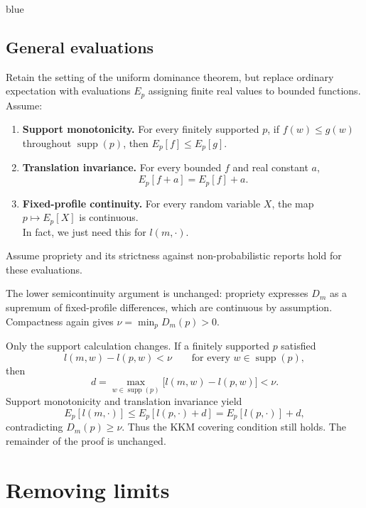 \documentclass[11pt]{article}
\theoremstyle{definition}
\theoremstyle{remark}
\newcommand{\supp}{\operatorname{supp}}
\newenvironment{AIwritten}{\begin{color}{blue}}{\end{color}}
\begin{document}
\begin{AIwritten}
	
	
	\subsection{General evaluations}\label{app:evaluations}
	
	Retain the setting of the uniform dominance theorem,
	but replace ordinary expectation with evaluations
	$E_p$ assigning finite real values to bounded functions.
	Assume:
	\begin{enumerate}
		\item \textbf{Support monotonicity.}
		For every finitely supported $p$, if
		$f(w)\le g(w)$ throughout $\supp(p)$, then
		$E_p[f]\le E_p[g]$.
		
		\item \textbf{Translation invariance.}
		For every bounded $f$ and real constant $a$,
		\[
		E_p[f+a]=E_p[f]+a.
		\]
		
		\item \textbf{Fixed-profile continuity.}
		For every random variable $X$, the map
		$p\mapsto E_p[X]$ is continuous.\\In fact, we just need this for $l(m,\cdot)$. 
	\end{enumerate}
	
	Assume propriety and its strictness against
	non-probabilistic reports hold for these evaluations.
	
	The lower semicontinuity argument is unchanged:
	propriety expresses $D_m$ as a supremum of
	fixed-profile differences, which are continuous by
	assumption. Compactness again gives
	$\nu=\min_pD_m(p)>0$.
	
	Only the support calculation changes.
	If a finitely supported $p$ satisfied
	\[
	l(m,w)-l(p,w)<\nu
	\qquad\text{for every }w\in\supp(p),
	\]
	then
	\[
	d=\max_{w\in\supp(p)}
	\bigl[l(m,w)-l(p,w)\bigr]<\nu.
	\]
	Support monotonicity and translation invariance yield
	\[
	E_p[l(m,\cdot)]
	\le E_p[l(p,\cdot)+d]
	=E_p[l(p,\cdot)]+d,
	\]
	contradicting $D_m(p)\ge\nu$.
	Thus the KKM covering condition still holds.
	The remainder of the proof is unchanged.

\end{AIwritten}


\section{Removing limits}\label{appendix:removinglims}
\end{document}
